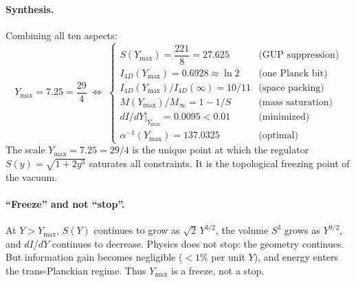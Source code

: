 \documentclass[a4paper,1pt,oneside,openany]{book}
\begin{document}
\paragraph{Synthesis.} Combining all ten aspects:
\begin{equation}
\boxed{
Y_{\max} = 7.25 = \frac{29}{4} \; \Longleftrightarrow \;
\begin{cases}
S(Y_{\max}) = \dfrac{221}{8} = 27.625 & \text{(GUP suppression)} \\
I_{4D}(Y_{\max}) = 0.6928 \approx \ln 2 & \text{(one Planck bit)} \\
I_{4D}(Y_{\max})/I_{4D}(\infty) = 10/11 & \text{(space packing)} \\
M(Y_{\max})/M_\infty = 1 - 1/S & \text{(mass saturation)} \\
dI/dY|_{Y_{\max}} = 0.0095 < 0.01 & \text{(minimized)} \\
\alpha^{-1}(Y_{\max}) = 137.0325 & \text{(optimal)}
\end{cases}
}
\label{eq:mviseqn}
\end{equation}
The scale \(Y_{\max} = 7.25 = 29/4\) is the unique point at which the regulator \(S(y) = \sqrt{1+2y^3}\) saturates all constraints. It is the topological freezing point of the vacuum.

\paragraph{``Freeze'' and not ``stop''.} At \(Y > Y_{\max}\), \(S(Y)\) continues to grow as \(\sqrt{2}\,Y^{3/2}\), the volume \(S^3\) grows as \(Y^{9/2}\), and \(dI/dY\) continues to decrease. Physics does not stop: the geometry continues. But information gain becomes negligible (\(<1\%\) per unit \(Y\)), and energy enters the trans-Planckian regime. Thus \(Y_{\max}\) is a freeze, not a stop.

\end{document}

